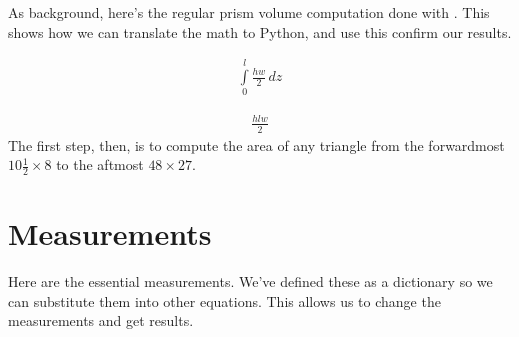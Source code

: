 \documentclass[letterpaper,10pt,english]{sphinxmanual}
\begin{document}
\sphinxAtStartPar
As background, here’s the regular prism volume computation done with . This shows how we can translate the math to Python, and use this confirm our results.

\begin{sphinxVerbatim}[commandchars=\\\{\}]
     

   
\end{sphinxVerbatim}
\begin{equation*}
\begin{split}\displaystyle \int\limits_{0}^{l} \frac{h w}{2}\, dz\end{split}
\end{equation*}
\begin{sphinxVerbatim}[commandchars=\\\{\}]
   
\end{sphinxVerbatim}
\begin{equation*}
\begin{split}\displaystyle \frac{h l w}{2}\end{split}
\end{equation*}
\sphinxAtStartPar
The first step, then, is to compute the area of any triangle from the forward\sphinxhyphen{}most \(10 \tfrac{1}{2} \times 8\) to the aft\sphinxhyphen{}most \(48 \times 27\).


\section{Measurements}
\label{\detokenize{prism-irregular:measurements}}
\sphinxAtStartPar
Here are the essential measurements. We’ve defined these as a dictionary so we can substitute them into other equations. This allows us to change the measurements and get results.
\end{document}
